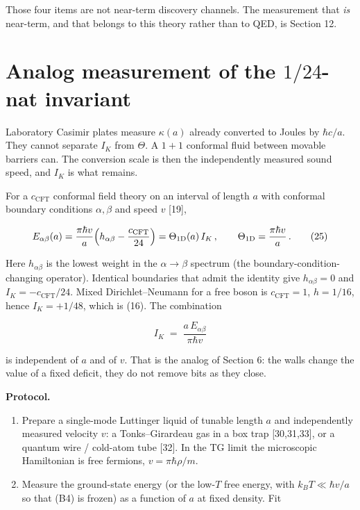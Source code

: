 \documentclass[11pt,letterpaper]{article}
\begin{document}
Those four items are not near-term discovery channels. The measurement that \emph{is} near-term, and that belongs to this theory rather than to QED, is Section 12.



\section{\texorpdfstring{Analog measurement of the \(1/24\)-nat invariant}{Analog measurement of the 1/24-nat invariant}}


Laboratory Casimir plates measure \(\kappa(a)\) already converted to Joules by \(\hbar c/a\). They cannot separate \(I_K\) from \(\Theta\). A \(1{+}1\) conformal fluid between movable barriers can. The conversion scale is then the independently measured sound speed, and \(I_K\) is what remains.


For a \(c_{\mathrm{CFT}}\) conformal field theory on an interval of length \(a\) with conformal boundary conditions \(\alpha,\beta\) and speed \(v\) [19],


\[
E_{\alpha\beta}(a)
=\frac{\pi\hbar v}{a}\Bigl(h_{\alpha\beta}-\frac{c_{\mathrm{CFT}}}{24}\Bigr)
=\Theta_{1\mathrm{D}}(a)\,I_K\,,
\qquad
\Theta_{1\mathrm{D}}=\frac{\pi\hbar v}{a}\,.
\tag{25}
\]


Here \(h_{\alpha\beta}\) is the lowest weight in the \(\alpha\to\beta\) spectrum (the boundary-condition-changing operator). Identical boundaries that admit the identity give \(h_{\alpha\beta}=0\) and \(I_K=-c_{\mathrm{CFT}}/24\). Mixed Dirichlet–Neumann for a free boson is \(c_{\mathrm{CFT}}=1\), \(h=1/16\), hence \(I_K=+1/48\), which is (16). The combination


\[
I_K\;=\;\frac{a\,E_{\alpha\beta}}{\pi\hbar v}
\tag{26}
\]


is independent of \(a\) and of \(v\). That is the analog of Section 6: the walls change the value of a fixed deficit, they do not remove bits as they close.


\textbf{Protocol.}


\begin{enumerate}
\item Prepare a single-mode Luttinger liquid of tunable length \(a\) and independently measured velocity \(v\): a Tonks–Girardeau gas in a box trap [30,31,33], or a quantum wire / cold-atom tube [32]. In the TG limit the microscopic Hamiltonian is free fermions, \(v=\pi\hbar\rho/m\).
\item Measure the ground-state energy (or the low-\(T\) free energy, with \(k_BT\ll\hbar v/a\) so that (B4) is frozen) as a function of \(a\) at fixed density. Fit
\end{enumerate}
\end{document}
